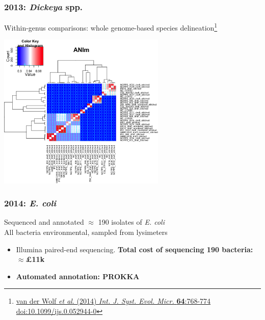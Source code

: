 \begin{frame}
  \frametitle{2013: \textit{Dickeya} spp.}
  Within-genus comparisons: whole genome-based species delineation\footnote{\tiny{\href{http://dx.doi.org/10.1099/ijs.0.052944-0}{van der Wolf \textit{et al}. (2014) \textit{Int. J. Syst. Evol. Micr.} \textbf{64}:768-774 doi:10.1099/ijs.0.052944-0}}}
  \begin{center}
    \includegraphics[width=0.6\textwidth]{images/dickeya_ani}
  \end{center}      
\end{frame}

\begin{frame}
  \frametitle{2014: \textit{E. coli}}
  Sequenced and annotated $\approx$ 190 isolates of \textit{E. coli} \\
  All bacteria environmental, sampled from lysimeters
  \begin{itemize}
    \item Illumina paired-end sequencing. \textbf{Total cost of sequencing 190 bacteria: $\approx$\pounds11k}
    \item \textbf{Automated annotation: PROKKA}
  \end{itemize}  
\end{frame}

